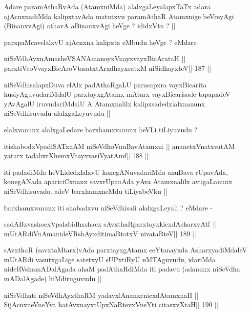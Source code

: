 \begin{artha}
Adare paramAthaRvAda (AtamxniMda) alalxgaLeyalapxTaTx adara
ajAcnxnadiMda kalipxtavAda matutxvu paramAthaR Atamxnige beVreyAgi
(BinanxvAgi) athavA aBinanxvAgi heVge ? ididxVtu ? ||

parxpaMcavelalxvU ajAcnxna kalipxta eMbudu heVge ? eMdare
\end{artha}

\begin{shl}
niSeVdhAyxnAmasheVSANAmanoyxVnayxvayxBicArataH ||
parxtiVcoV\s vayxBicAroV\s tasatxtArxdhayxsatxM niSidhayxteV\hfill || 187 ||
\end{shl}

\begin{artha}
niSeVdhisalapxDuva elAlx padAthaRgaLU parasapxra vayxBicarita
husiyAguvudariMdalU parxtayxgAtamx mAtarx vayxBicarisade tapapxdeV
yAvAgalU iruvudariMdalU A Atamxnalilx kalipxsadedxlalxnanunx
niSeVdhisuvudu alalxgaLeyuvudu ||

elalxvanunx alalxgaLedare barxhamxvanunx heVLi tiLiyuvudu ?
\end{artha}

\begin{shl}
itishabodxVpadiSATxnAM niSeVdhoV\s nuBavAtamxni ||
ananetxV\s natxvatAM yatarx tadabxrXhemxVtayxvasiVyatAmf\hfill || 188 ||
\end{shl}

\begin{artha}
iti padadiMda heVLidedxlalxvU konegANuvadariMda anuBava rUpavAda,
konegANada apariciCxnanx savxrUpanAda yAva Atamxnalilx avugaLanunx
niSeVdhisuvado. adeV barxhamxneMdu tiLiyabeVku ||

barxhamxvanunx iti shabadxvu niSeVdhisali alalxgaLeyali ? eMdare -
\end{artha}

\begin{shl}
sadABxvashocxVpalabidhxshacx sAvxthaRparxtayxkicxdAsharxyAtf ||
mUtARdiVnAmanideVRshAyxditimaRtotxV nivataRteV\hfill || 189 ||
\end{shl}

\begin{artha}
sAvxthaR (savxtaMtarx)vAda parxtayxgAtamx ceYtanayxda AsharxyadiMdaleV
mUtARdi vasutxgaLige satetxyU sUPxtiRyU uMTAguvudu, idariMda
nideRVshamADalAgada ahaM padAthaRdiMda iti padavu (adanunx niSeVdha
mADalAgade) hiMdiruguvudu ||
\end{artha}

\begin{shl}
niSeVdhati niSeVdhAyxthaRM yadavxlAnanxcnicxdAtamxnaH ||
SijAcnxneVneYva hatAvx\s nayxtUpxNaRtevxVneYti citasxvXtaH\hfill || 190 ||
\end{shl}

